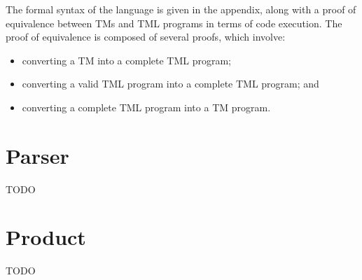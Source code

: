The formal syntax of the language is given in the appendix, along with a proof of equivalence between TMs and TML programs in terms of code execution. The proof of equivalence is composed of several proofs, which involve:
\begin{itemize}
    \item converting a TM into a complete TML program;
    \item converting a valid TML program into a complete TML program; and
    \item converting a complete TML program into a TM program.
\end{itemize}

\section{Parser}
TODO

\section{Product}
TODO
